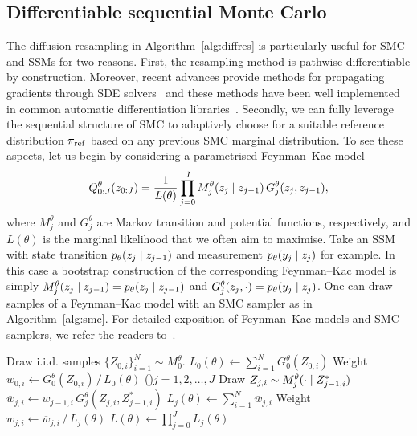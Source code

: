 \documentclass{article}
\begin{document}
\subsection{Differentiable sequential Monte Carlo}
\label{sec:diffres-smc}
The diffusion resampling in Algorithm~\ref{alg:diffres} is particularly useful for SMC and SSMs for two reasons. 
First, the resampling method is pathwise-differentiable by construction. 
Moreover, recent advances provide methods for propagating gradients through SDE solvers~\citep[see, e.g.,][]{Bartosh2025sde, LiXueChen2020, Kidger2021gradient} and these methods have been well implemented in common automatic differentiation libraries~\citep{Kidger2021on}.
Secondly, we can fully leverage the sequential structure of SMC to adaptively choose for a suitable reference distribution $\pi_{\mathrm{ref}}$ based on any previous SMC marginal distribution.
To see these aspects, let us begin by considering a parametrised Feynman--Kac model
%
\begin{equation}
    Q^\theta_{0:J}(z_{0:J}) = \frac{1}{L(\theta)} \prod_{j=0}^J M_{j}^\theta(z_j {\;|\;} z_{j-1}) \, G_j^\theta(z_j, z_{j-1}), 
	\label{equ:fk}
\end{equation}
%
where $M^\theta_j$ and $G_j^\theta$ are Markov transition and potential functions, respectively, and $L(\theta)$ is the marginal likelihood that we often aim to maximise. 
Take an SSM with state transition $p_\theta(z_j {\;|\;} z_{j-1})$ and measurement $p_\theta(y_j {\;|\;} z_j)$ for example. 
In this case a bootstrap construction of the corresponding Feynman--Kac model is simply $M_j^\theta(z_j {\;|\;} z_{j-1}) = p_\theta(z_j {\;|\;} z_{j-1})$ and $G_j^\theta(z_j, \cdot) = p_\theta(y_j {\;|\;} z_j)$. 
One can draw samples of a Feynman--Kac model with an SMC sampler as in Algorithm~\ref{alg:smc}.
For detailed exposition of Feynman--Kac models and SMC samplers, we refer the readers to~\citet{ChopinBook2020, DelMoral2004}.

\begin{algorithm2e}[h]
	\SetAlgoLined
	\DontPrintSemicolon
	Draw i.i.d. samples $\lbrace Z_{0, i} \rbrace_{i=1}^N \sim M_0^\theta$.\;
    $L_0(\theta) \gets \sum_{i=1}^N G^\theta_0(Z_{0, i})$\;
	Weight $w_{0, i} \gets G_0^\theta(Z_{0, i}) \, / \, L_0(\theta)$ \;
	\For(){$j=1,2,\ldots, J$}{%
		Draw $Z_{j, i} \sim M^\theta_{j}(\cdot {\;|\;} Z^*_{j-1, i})$ \;
        $\overline{w}_{j, i} \gets w_{j-1, i} \, G_j^\theta(Z_{j, i}, Z_{j-1, i}^*)$\;
		$L_j(\theta) \gets \sum_{i=1}^N \overline{w}_{j, i}$\;
        Weight $w_{j, i} \gets \overline{w}_{j, i} \, / \, L_j(\theta)$ \;
	}
    $L(\theta) \gets \prod_{j=0}^J L_j(\theta)$\;
	\caption{Differentiable sequential Monte Carlo (SMC) for sampling Feynman--Kac model $Q_{0:J}$. }
	\label{alg:smc}
\end{algorithm2e}
\end{document}

